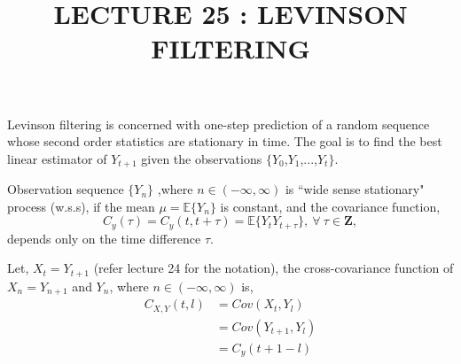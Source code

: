 \documentclass[11pt,english]{article}
\title{LECTURE 25 : LEVINSON FILTERING}
\begin{document}
\maketitle
\noindent 
Levinson filtering is concerned with one-step prediction of a random sequence whose second order statistics are stationary in time. The goal is to find the best linear estimator of ${Y_{t+1}}$ given the observations $\{{Y_0}$,${Y_1}$,...,${Y_t}\}$. 
\begin{defn}
Observation sequence $\{Y_n\}$ ,where $n \in (-\infty,\infty)$ is ``wide sense stationary" process (w.s.s), if the mean $\mu=\mathbb{E}\{Y_n\}$ is constant, and the covariance function,
\begin{equation*}
C_y(\tau)=C_y(t,t+\tau) = \mathbb{E}\{Y_tY_{t+\tau}\},~\forall~\tau \in \mathbf{Z},
\end{equation*}
depends only on the time difference $\tau$.
\end{defn}
Let, $X_t = Y_{t + 1}$ (refer lecture 24 for the notation), the cross-covariance function of $X_n=Y_{n+1}$ and $Y_n$, where $n \in (-\infty,\infty)$ is,
\begin{align*}
C_{X,Y}(t,l) &= Cov(X_t,Y_l) \\
& =  Cov(Y_{t+1},Y_l) \\
& = C_y(t+1-l)
\end{align*}
\end{document}
